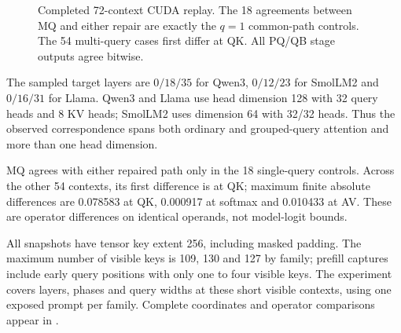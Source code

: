 \begin{figure}[t]\centering
\resizebox{\columnwidth}{!}{}
\caption{Completed 72-context CUDA replay. The 18 agreements between MQ and either repair are exactly the $q=1$ common-path controls. The 54 multi-query cases first differ at QK. All PQ/QB stage outputs agree bitwise.}
\label{fig:numeric}
\end{figure}

The sampled target layers are $0/18/35$ for Qwen3, $0/12/23$ for SmolLM2 and $0/16/31$ for Llama. Qwen3 and Llama use head dimension 128 with 32 query heads and 8 KV heads; SmolLM2 uses dimension 64 with 32/32 heads. Thus the observed correspondence spans both ordinary and grouped-query attention and more than one head dimension.

MQ agrees with either repaired path only in the 18 single-query controls. Across the other 54 contexts, its first difference is at QK; maximum finite absolute differences are 0.078583 at QK, 0.000917 at softmax and 0.010433 at AV. These are operator differences on identical operands, not model-logit bounds.

All snapshots have tensor key extent 256, including masked padding. The maximum number of visible keys is 109, 130 and 127 by family; prefill captures include early query positions with only one to four visible keys. The experiment covers layers, phases and query widths at these short visible contexts, using one exposed prompt per family. Complete coordinates and operator comparisons appear in .


